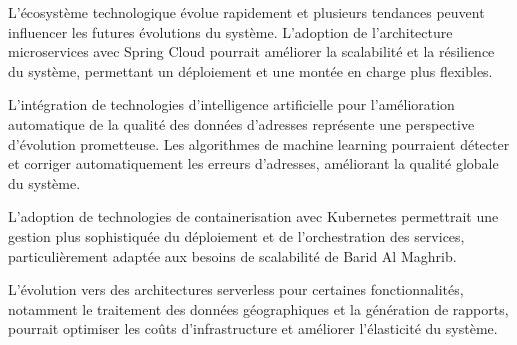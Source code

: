L'écosystème technologique évolue rapidement et plusieurs tendances peuvent influencer les futures évolutions du système. L'adoption de l'architecture microservices avec Spring Cloud pourrait améliorer la scalabilité et la résilience du système, permettant un déploiement et une montée en charge plus flexibles.

L'intégration de technologies d'intelligence artificielle pour l'amélioration automatique de la qualité des données d'adresses représente une perspective d'évolution prometteuse. Les algorithmes de machine learning pourraient détecter et corriger automatiquement les erreurs d'adresses, améliorant la qualité globale du système.

L'adoption de technologies de containerisation avec Kubernetes permettrait une gestion plus sophistiquée du déploiement et de l'orchestration des services, particulièrement adaptée aux besoins de scalabilité de Barid Al Maghrib.

L'évolution vers des architectures serverless pour certaines fonctionnalités, notamment le traitement des données géographiques et la génération de rapports, pourrait optimiser les coûts d'infrastructure et améliorer l'élasticité du système.
